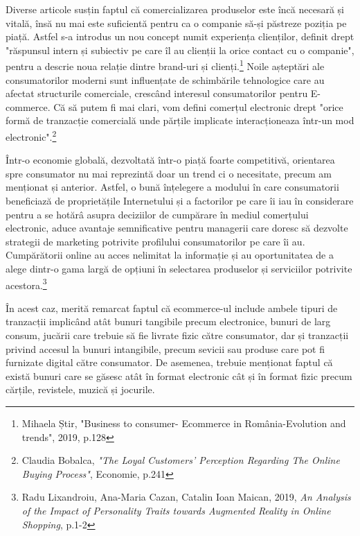 \documentclass[a4paper, 12pt]{article}
\begin{document}
	\quad Diverse articole susțin faptul că comercializarea produselor este încă necesară și vitală, însă nu mai este suficientă pentru ca o companie să-și păstreze poziția pe piață. Astfel s-a introdus un nou concept numit experiența clienților, definit drept "răspunsul intern și subiectiv pe care îl au clienții la orice contact cu o companie", pentru a descrie noua relație dintre brand-uri și clienți.\footnote{Mihaela Știr, "Business to consumer- Ecommerce in România-Evolution and trends", 2019, p.128} Noile așteptări ale consumatorilor moderni sunt influențate de schimbările tehnologice care au afectat structurile comerciale, crescând interesul consumatorilor pentru E-commerce. Că să putem fi mai clari, vom defini comerțul electronic drept "orice formă de tranzacție comercială unde părțile implicate interacționeaza într-un mod electronic".\footnote{Claudia Bobalca, \textit{"The Loyal Customers’ Perception Regarding The Online Buying Process"}, Economie, p.241}	
	
	\quad Într-o economie globală, dezvoltată într-o piață foarte competitivă, orientarea spre consumator nu mai reprezintă doar un trend ci o necesitate, precum am menționat și anterior. Astfel, o bună înțelegere a modului în care consumatorii beneficiază de proprietățile Internetului și a factorilor pe care îi iau în considerare pentru a se hotărâ asupra deciziilor de cumpărare în mediul comerțului electronic, aduce avantaje semnificative pentru managerii care doresc să dezvolte strategii de marketing potrivite profilului consumatorilor pe care îi au. Cumpărătorii online au acces nelimitat la informație și au oportunitatea de a alege dintr-o gama largă de opțiuni în selectarea produselor și serviciilor potrivite acestora.\footnote{Radu Lixandroiu, Ana-Maria Cazan, Catalin Ioan Maican, 2019, \textit{An Analysis of the Impact of Personality Traits towards
			Augmented Reality in Online Shopping}, p.1-2}

	\quad În acest caz, merită remarcat faptul că ecommerce-ul include ambele tipuri de tranzacții implicând atât bunuri tangibile precum electronice, bunuri de larg consum, jucării care trebuie să fie livrate fizic către consumator, dar și tranzacții privind accesul la bunuri intangibile, precum sevicii sau produse care pot fi furnizate digital către consumator. De asemenea, trebuie menționat faptul că există bunuri care se găsesc atât în format electronic cât și în format fizic precum cărțile, revistele, muzică și jocurile.
\end{document}
